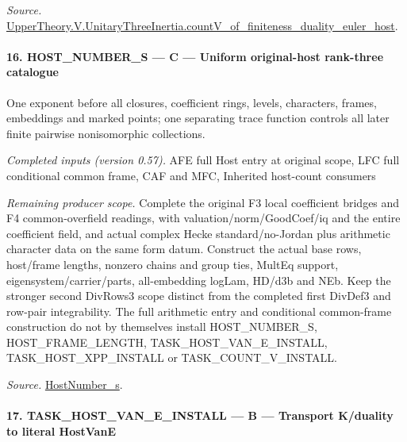 \documentclass[11pt,a4paper]{article}
\numberwithin{equation}{section}
\theoremstyle{remark}\newtheorem{remark}[theorem]{Remark}
\begin{document}
\emph{Source.} \href{https://github.com/CocoSgt/riemann-hypothesis-lean/blob/7cbf7a0c32fca1badf05931879a37c3f8a2b03b4/src/Development/AutomorphicArithmetic/AutomorphicVarieties/ModularityArgument/ThresholdArguments/DenseThresholdCases/CountVOf.lean#L33-L60}{UpperTheory.V.UnitaryThreeInertia.countV\_\allowbreak of\_\allowbreak finiteness\_\allowbreak duality\_\allowbreak euler\_\allowbreak host}.



\paragraph{16. HOST\_\allowbreak NUMBER\_\allowbreak S — C — Uniform original-host rank-three catalogue}

One exponent before all closures, coefficient rings, levels, characters, frames, embeddings and marked points; one separating trace function controls all later finite pairwise nonisomorphic collections.

\emph{Completed inputs (version 0.57).} AFE full Host entry at original scope, LFC full conditional common frame, CAF and MFC, Inherited host-count consumers

\emph{Remaining producer scope.} Complete the original F3 local coefficient bridges and F4 common-overfield readings, with valuation/norm/GoodCoef/iq and the entire coefficient field, and actual complex Hecke standard/no-Jordan plus arithmetic character data on the same form datum. Construct the actual base rows, host/frame lengths, nonzero chains and group ties, MultEq support, eigensystem/carrier/parts, all-embedding logLam, HD/d3b and NEb. Keep the stronger second DivRows3 scope distinct from the completed first DivDef3 and row-pair integrability. The full arithmetic entry and conditional common-frame construction do not by themselves install HOST\_\allowbreak NUMBER\_\allowbreak S, HOST\_\allowbreak FRAME\_\allowbreak LENGTH, TASK\_\allowbreak HOST\_\allowbreak VAN\_\allowbreak E\_\allowbreak INSTALL, TASK\_\allowbreak HOST\_\allowbreak XPP\_\allowbreak INSTALL or TASK\_\allowbreak COUNT\_\allowbreak V\_\allowbreak INSTALL.

\emph{Source.} \href{https://github.com/CocoSgt/riemann-hypothesis-lean/blob/7cbf7a0c32fca1badf05931879a37c3f8a2b03b4/src/Development/AutomorphicArithmetic/AutomorphicVarieties/ModularityArgument/ThresholdArguments/DenseThresholdCases/HostNumberS.lean#L18-L28}{HostNumber\_\allowbreak s}.



\paragraph{17. TASK\_\allowbreak HOST\_\allowbreak VAN\_\allowbreak E\_\allowbreak INSTALL — B — Transport K/duality to literal HostVanE}
\end{document}
